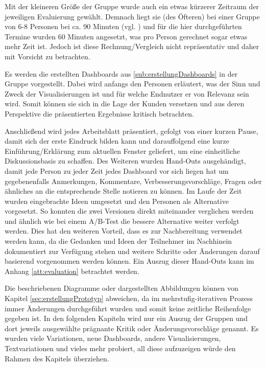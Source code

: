 Mit der kleineren Größe der Gruppe wurde auch ein etwas kürzerer Zeitraum der jeweiligen Evaluierung gewählt.
Demnach liegt sie (des Öfteren) bei einer Gruppe von 6-8 Personen bei ca. 90 Minuten (vgl. \cite{Madche.}) und für die hier durchgeführten Termine wurden 60 Minuten angesetzt, was pro Person gerechnet sogar etwas mehr Zeit ist.
Jedoch ist diese Rechnung/Vergleich nicht repräsentativ und daher mit Vorsicht zu betrachten.

Es werden die erstellten Dashboards aus \ref{sub:erstellungDashboards} in der Gruppe vorgestellt. 
Dabei wird anfangs den Personen erläutert, was der Sinn und Zweck der Visualisierungen ist und für welche Endnutzer er von Relevanz sein wird.
Somit können sie sich in die Lage der Kunden versetzen und aus deren Perspektive die präsentierten Ergebnisse kritisch betrachten.

Anschließend wird jedes Arbeitsblatt präsentiert, gefolgt von einer kurzen Pause, damit sich der erste Eindruck bilden kann und darauffolgend eine kurze Einführung/Erklärung zum aktuellen Fenster geliefert, um eine einheitliche Diskussionsbasis zu schaffen.
Des Weiteren wurden Hand-Outs ausgehändigt, damit jede Person zu jeder Zeit jedes Dashboard vor sich liegen hat um gegebenenfalls Anmerkungen, Kommentare, Verbesserungsvorschläge, Fragen oder ähnliches an die entsprechende Stelle notieren zu können.
Im Laufe der Zeit wurden eingebrachte Ideen umgesetzt und den Personen als Alternative vorgesetzt.
So konnten die zwei Versionen direkt miteinander verglichen werden und ähnlich wie bei einem A/B-Test die bessere Alternative weiter verfolgt werden.
Dies hat den weiteren Vorteil, dass es zur Nachbereitung verwendet werden kann, da die Gedanken und Ideen der Teilnehmer im Nachhinein dokumentiert zur Verfügung stehen und weitere Schritte oder Änderungen darauf basierend vorgenommen werden können. 
Ein Auszug dieser Hand-Outs kann im Anhang \ref{att:evaluation} betrachtet werden.

Die beschriebenen Diagramme oder dargestellten Abbildungen können von Kapitel \ref{sec:erstellungPrototyp} abweichen, da im mehrstufig-iterativen Prozess immer Änderungen durchgeführt wurden und somit keine zeitliche Reihenfolge gegeben ist.
In den folgenden Kapiteln wird nur ein Auszug der Gruppen und dort jeweils ausgewählte prägnante Kritik oder Änderungsvorschläge genannt.
Es wurden viele Variationen, neue Dashboards, andere Visualisierungen, Textvariationen und vieles mehr probiert, all diese aufzuzeigen würde den Rahmen des Kapitels überziehen.

